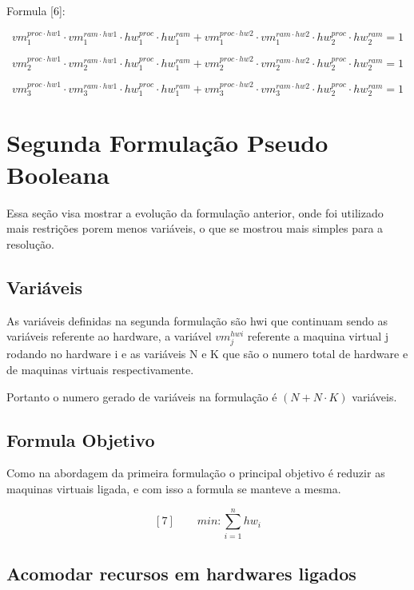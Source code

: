 Formula [6]:


$$vm_1^{proc \cdot hw1} \cdot vm_{1}^{ram \cdot hw1} \cdot hw_{1}^{proc} \cdot hw_{1}^{ram} + vm_1^{proc \cdot hw2} \cdot vm_{1}^{ram \cdot hw2} \cdot hw_{2}^{proc} \cdot hw_{2}^{ram} = 1 $$


$$vm_2^{proc \cdot hw1} \cdot vm_{2}^{ram \cdot hw1} \cdot hw_{1}^{proc} \cdot hw_{1}^{ram} + vm_2^{proc \cdot hw2} \cdot vm_{2}^{ram \cdot hw2} \cdot hw_{2}^{proc} \cdot hw_{2}^{ram} = 1 $$


$$vm_3^{proc \cdot hw1} \cdot vm_{3}^{ram \cdot hw1} \cdot hw_{1}^{proc} \cdot hw_{1}^{ram} + vm_3^{proc \cdot hw2} \cdot vm_{3}^{ram \cdot hw2} \cdot hw_{2}^{proc} \cdot hw_{2}^{ram} = 1 $$

\section{Segunda Formulação Pseudo Booleana}

Essa seção visa mostrar a evolução da formulação anterior, onde foi utilizado mais restrições porem menos variáveis, o que se mostrou mais simples para a resolução.

\subsection{Variáveis}

As variáveis definidas na segunda formulação são hwi que continuam sendo as variáveis referente ao hardware, a variável $vm_j^{hwi}$ referente a maquina virtual  j rodando no hardware i e as variáveis N e K que são o numero total de hardware e de maquinas virtuais respectivamente.

Portanto o numero gerado de variáveis na formulação é $(N+N \cdot K) $ variáveis.



\subsection{Formula Objetivo}
 
 Como na abordagem da primeira formulação o principal objetivo é reduzir as maquinas virtuais ligada, e com isso a formula se manteve a mesma.

 $$[7] \qquad min: \sum_{i=1}^{n} hw_{i}$$	

\subsection{Acomodar recursos em hardwares ligados}

